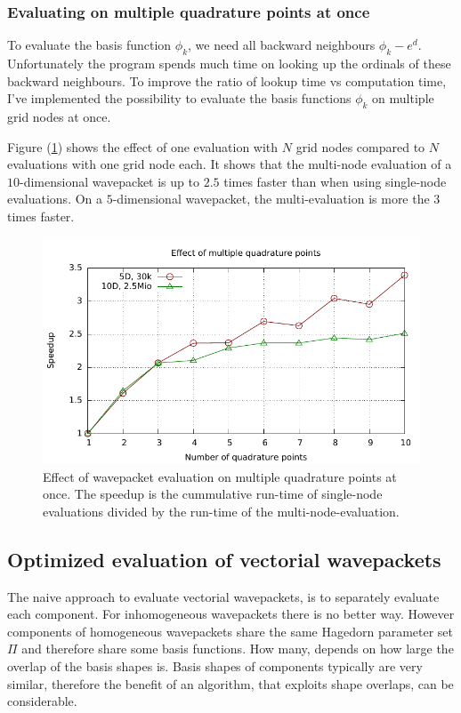 \documentclass{article}
\begin{document}
\subsubsection{Evaluating on multiple quadrature points at once}

To evaluate the basis function \(\phi_k\), we need all backward neighbours
\(\phi_k-e^d\).
Unfortunately the program spends much time on looking up the ordinals of these
backward neighbours. To improve the ratio of lookup time vs computation time,
I've implemented the possibility to evaluate the basis functions \(\phi_k\)
on multiple grid nodes at once.

Figure (\ref{fig:hawp_eval_multiqp}) shows the effect of one
evaluation with \(N\) grid nodes compared to \(N\) evaluations with one
grid node each. It shows that the multi-node evaluation of a \(10\)-dimensional
wavepacket is up to \(2.5\) times faster than when using single-node evaluations.
On a \(5\)-dimensional wavepacket, the multi-evaluation is more the \(3\) times faster.

\begin{figure}[H]
  \centering
  \includegraphics[width=1.0\textwidth]{plots/hawp_eval_multiqp}
  \caption{
    Effect of wavepacket evaluation on multiple quadrature points at once.
    The speedup is the cummulative run-time of single-node evaluations divided by
    the run-time of the multi-node-evaluation.
  }
  \label{fig:hawp_eval_multiqp}
\end{figure}

\subsection{Optimized evaluation of vectorial wavepackets} \label{sec:vector_hawp_eval}
The naive approach to evaluate vectorial wavepackets, is to separately
evaluate each component. For inhomogeneous wavepackets there is
no better way.
However components of homogeneous wavepackets share the same Hagedorn parameter set \(\Pi\)
and therefore share some basis functions. How many, depends on how large the overlap of
the basis shapes is. Basis shapes of components typically are very similar, therefore
the benefit of an algorithm, that exploits shape overlaps, can be considerable.
\end{document}
